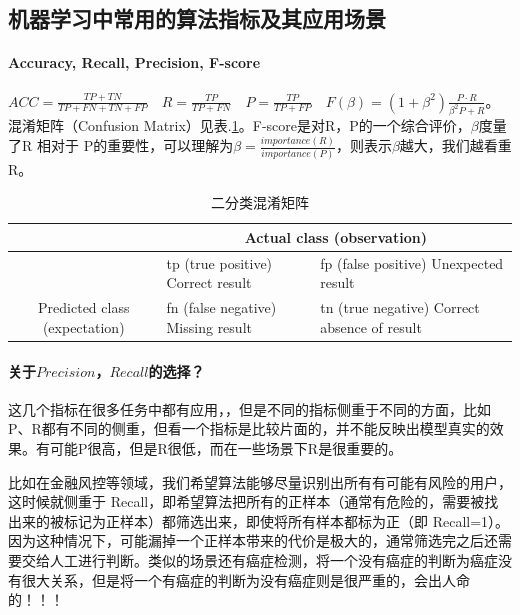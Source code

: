 \subsection{机器学习中常用的算法指标及其应用场景}

\paragraph{Accuracy, Recall, Precision, F-score}

$ACC = \frac{TP + TN}{TP+FN+TN+FP}\quad R = \frac{TP}{TP+FN}\quad P = \frac{TP}{TP+FP}\quad F(\beta) = (1 + \beta^2)\frac{P \cdot R}{\beta^2 P + R}$。混淆矩阵（Confusion Matrix）见表.\ref{tab:confusion_mat}。F-score是对R，P的一个综合评价，$\beta$度量了R 相对于 P的重要性，可以理解为$\beta = \frac{importance(R) }{importance(P)}$，则表示$\beta$越大，我们越看重R。

\begin{table}[h]
	\centering
	\caption{二分类混淆矩阵}
	\label{tab:confusion_mat}
	\begin{tabular}{|c|l|l|}
		\hline
		\multicolumn{1}{|l|}{}                          & \multicolumn{2}{c|}{Actual class (observation)}                                                                                   \\ \hline
		& tp (true positive) Correct result                          & fp (false positive) Unexpected result                                \\ \cline{2-3} 
		\multirow{-2}{*}{Predicted class (expectation)} & \cellcolor[HTML]{68CBD0}fn (false negative) Missing result & \cellcolor[HTML]{68CBD0}tn (true negative) Correct absence of result \\ \hline
	\end{tabular}
\end{table}

\paragraph*{关于$Precision$，$Recall$的选择？}这几个指标在很多任务中都有应用，，但是不同的指标侧重于不同的方面，比如P、R都有不同的侧重，但看一个指标是比较片面的，并不能反映出模型真实的效果。有可能P很高，但是R很低，而在一些场景下R是很重要的。

比如在金融风控等领域，我们希望算法能够尽量识别出所有有可能有风险的用户，这时候就侧重于 Recall，即希望算法把所有的正样本（通常有危险的，需要被找出来的被标记为正样本）都筛选出来，即使将所有样本都标为正（即 Recall=1）。因为这种情况下，可能漏掉一个正样本带来的代价是极大的，通常筛选完之后还需要交给人工进行判断。类似的场景还有癌症检测，将一个没有癌症的判断为癌症没有很大关系，但是将一个有癌症的判断为没有癌症则是很严重的，会出人命的！！！

